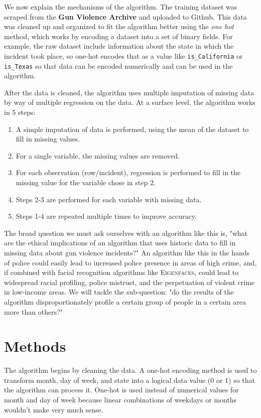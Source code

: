\documentclass{article}
\newcommand{\be}{\begin{enumerate}}
\newcommand{\ee}{\end{enumerate}}
\begin{document}
We now explain the mechanisms of the algorithm. The training dataset was scraped from the \textbf{Gun Violence Archive} and uploaded to Github\cite{website:github_jamesqo_gun-violence-data}. This data was cleaned up and organized to fit the algorithm better using the \textit{one hot} method, which works by encoding a dataset into a set of binary fields. For example, the raw dataset include information about the state in which the incident took place, so one-hot encodes that as a value like \texttt{is\_California} or \texttt{is\_Texas} so that data can be encoded numerically and can be used in the algorithm. 

After the data is cleaned, the algorithm uses multiple imputation of missing data by way of multiple regression on the data. At a surface level, the algorithm works in 5 steps\cite{mice-paper}:

\be
\item A simple imputation of data is performed, using the mean of the dataset to fill in missing values.
\item For a single variable, the missing values are removed.
\item For each observation (row/incident), regression is performed to fill in the missing value for the variable chose in step 2.
\item Steps 2-3 are performed for each variable with missing data.
\item Steps 1-4 are repeated multiple times to improve accuracy.
\ee

The broad question we must ask ourselves with an algorithm like this is, "what are the ethical implications of an algorithm that uses historic data to fill in missing data about gun violence incidents?" An algorithm like this in the hands of police could easily lead to increased police presence in areas of high crime, and, if combined with facial recognition algorithms like \textsc{Eigenfaces}, could lead to widespread racial profiling, police mistrust, and the perpetuation of violent crime in low-income areas. We will tackle the sub-question: "do the results of the algorithm disproportionately profile a certain group of people in a certain area more than others?" 

\section*{Methods}
The algorithm begins by cleaning the data. A one-hot encoding method is used to transform month, day of week, and state into a logical data value (0 or 1) so that the algorithm can process it. One-hot is used instead of numerical values for month and day of week because linear combinations of weekdays or months wouldn't make very much sense.
\end{document}
